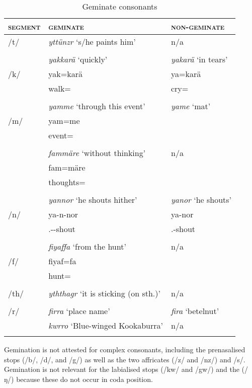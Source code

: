 \begin{table}
\caption{Geminate consonants}
\label{geminates}
	\begin{tabular}{lll}
		\lsptoprule
		\textsc{segment} & \textsc{geminate} & \textsc{non-geminate} \\ \midrule
		/t/ & \emph{yttünzr} `s/he paints him' & n/a \\
		&&\\
		& \emph{yakkarä} `quickly' & \emph{yakarä} `in tears'\\
		/k/ & yak=karä & ya=karä \\
		& walk=\Prop{} & cry=\Prop{}\\
		&&\\
		& \emph{yamme} `through this event' & \emph{yame} `mat' \\
		/m/ & yam=me & \\
		& event=\Ins{} & \\
		&&\\
		& \emph{fammäre} `without thinking' & n/a \\
 	   	& fam=märe & \\
 	   	& thoughts=\Priv{} & \\
		&&\\
		& \emph{yannor} `he shouts hither' & \emph{yanor} `he shouts'\\
		/n/ & ya-n-nor & ya-nor \\
		& \Tsg{}.\Masc{}-\Venit{}-shout & \Tsg{}.\Masc{}-shout\\
		&&\\
 	   	& \emph{fiyaffa} `from the hunt' & n/a \\
		/f/ & fiyaf=fa & \\
		& hunt=\Abl{} & \\
		&&\\
		/th/ & \emph{yththagr} `it is sticking (on sth.)' 	& n/a \\
		&&\\
		/r/ & \emph{firra} `place name' & \emph{fira} `betelnut'\\
		& \emph{kwrro} `Blue-winged Kookaburra' & n/a \\
		\lspbottomrule
	\end{tabular}
\end{table}%

Gemination is not attested for complex consonants, including the prenasalised stops (/b/, /d/, and /g/) as well as the two affricates (/z/ and /nz/) and /s/. Gemination is not relevant for the labialised  stops (/kw/ and /gw/) and the   (/ŋ/) because these do not occur in coda position.

